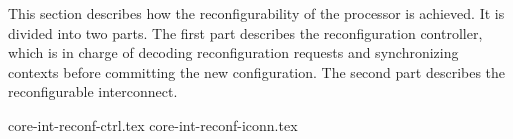 
\label{sec:core-int-reconf}

This section describes how the reconfigurability of the \rvex{} processor is
achieved. It is divided into two parts. The first part describes the
reconfiguration controller, which is in charge of decoding reconfiguration
requests and synchronizing contexts before committing the new configuration. The
second part describes the reconfigurable interconnect.

{core-int-reconf-ctrl.tex}
{core-int-reconf-iconn.tex}

